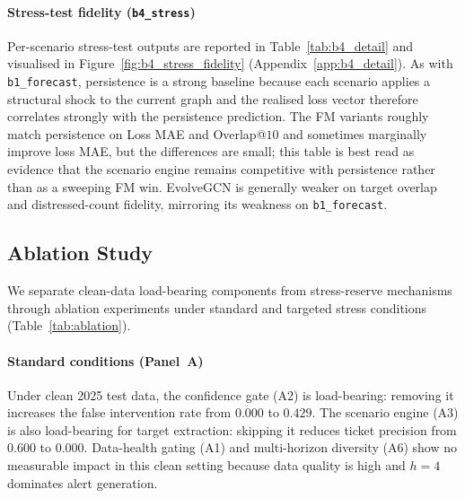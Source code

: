 \paragraph{Stress-test fidelity (\texttt{b4\_stress})} Per-scenario stress-test outputs are reported in Table~\ref{tab:b4_detail} and visualised in Figure~\ref{fig:b4_stress_fidelity} (Appendix~\ref{app:b4_detail}). As with \texttt{b1\_forecast}, persistence is a strong baseline because each scenario applies a structural shock to the current graph and the realised loss vector therefore correlates strongly with the persistence prediction. The FM variants roughly match persistence on Loss MAE and Overlap@$10$ and sometimes marginally improve loss MAE, but the differences are small; this table is best read as evidence that the scenario engine remains competitive with persistence rather than as a sweeping FM win. EvolveGCN is generally weaker on target overlap and distressed-count fidelity, mirroring its weakness on \texttt{b1\_forecast}.

\subsection{Ablation Study}

We separate clean-data load-bearing components from stress-reserve mechanisms through ablation experiments under standard and targeted stress conditions (Table~\ref{tab:ablation}).



\paragraph{Standard conditions (Panel~A)} Under clean 2025 test data, the confidence gate (A2) is load-bearing: removing it increases the false intervention rate from $0.000$ to $0.429$. The scenario engine (A3) is also load-bearing for target extraction: skipping it reduces ticket precision from $0.600$ to $0.000$. Data-health gating (A1) and multi-horizon diversity (A6) show no measurable impact in this clean setting because data quality is high and $h=4$ dominates alert generation.

